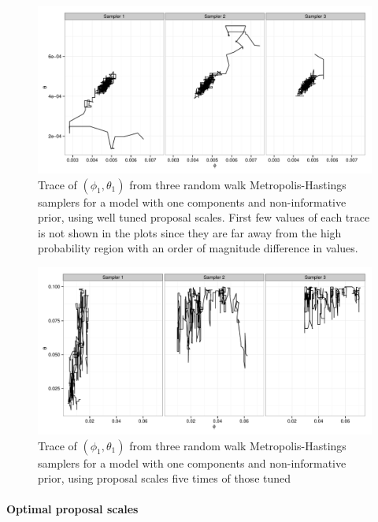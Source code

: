 
\begin{figure}
  \includegraphics[width=\linewidth]{fig/PET_MH_Path.pdf}
  \caption{Trace of $(\phi_1,\theta_1)$ from three random walk
    Metropolis-Hastings samplers for a \pet model with one components and
    non-informative prior, using well tuned proposal scales. First few values
    of each trace is not shown in the plots since they are far away from the
    high probability region with an order of magnitude difference in values.}
  \label{fig:pet mh tuned}
\end{figure}

\begin{figure}
  \includegraphics[width=\linewidth]{fig/PET_MH_H_Path.pdf}
  \caption{Trace of $(\phi_1,\theta_1)$ from three random walk
    Metropolis-Hastings samplers for a \pet model with one components and
    non-informative prior, using proposal scales five times of those tuned}
  \label{fig:pet mh untuned}
\end{figure}

\paragraph{Optimal proposal scales}

